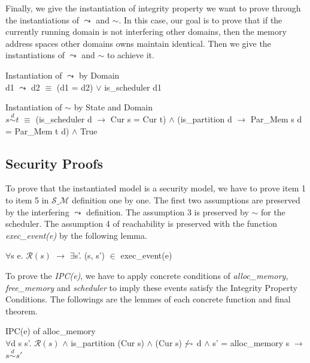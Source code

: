 \documentclass[runningheads]{llncs}
\makeatletter
\newcommand{\equidom}[3]{{#1}\stackrel{#2}{\sim}{#3}}
\newcommand{\superimpose}[2]
	{{\ooalign{$#1\@firstoftwo#2$\cr\hfil$#1\@secondoftwo#2$\hfil\cr}}}
\newcommand{\interf}{\leadsto}
\newcommand{\ninterf}{\mathrel{\mathpalette\superimpose{{\slash}{\leadsto}}}}
\makeatother
\begin{document}
Finally, we give the instantiation of integrity property we want to prove through the instantiations of $\interf$ and $\sim$. In this case, our goal is to prove that if the currently running domain is not interfering other domains, then the memory address spaces other domains owns maintain identical. Then we give the instantiations of $\interf$ and $\sim$ to achieve it.

\begin{definition} {Instantiation of $\interf$ by Domain} \\
d1 $\interf$ d2 $\equiv$ (d1 = d2) $\vee$ is\_scheduler d1
\end{definition}

\begin{definition} {Instantiation of $\sim$ by State and Domain} \\
$\equidom{s}{d}{t}$ $\equiv$ (is\_scheduler d $\longrightarrow$ Cur s = Cur t) $\wedge$ (is\_partition d $\longrightarrow$ Par\_Mem s d = Par\_Mem t d) $\wedge$ True
\end{definition}


\subsection{Security Proofs}

To prove that the instantiated model is a security model, we have to prove item 1 to item 5 in $\mathcal{S\_M}$ definition one by one. The first two assumptions are preserved by the interfering $\interf$ definition. The assumption 3 is preserved by $\sim$ for the scheduler. The assumption 4 of reachability is preserved with the function \textsl{exec\_event(e)} by the following lemma.

\begin{lemma}
$\forall$s e. $\mathcal{R}(s)$ $\longrightarrow$ $\exists$s'. (s, s') $\in$ exec\_event(e)
\end{lemma}

To prove the \textsl{IPC(e)}, we have to apply concrete conditions of \textsl{alloc\_memory}, \textsl{free\_memory} and \textsl{scheduler} to imply these events satisfy the Integrity Property Conditions. The followings are the lemmes of each concrete function and final theorem.

\begin{lemma} {IPC(e) of alloc\_memory} \\
$\forall$d s s'. $\mathcal{R}(s)$ $\wedge$ is\_partition (Cur s) $\wedge$ (Cur s) $\ninterf$ d $\wedge$ s' = alloc\_memory s $\longrightarrow$ $\equidom{s}{d}{s'}$
\end{lemma}
\end{document}
